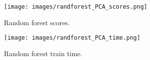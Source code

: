 \begin{figure}[h!]
    \centering
    \texttt{[image: images/randforest\_PCA\_scores.png]}
    \caption{Random forest scores.}
    \label{fig:randfor_scores}
\end{figure} 
 
 \begin{figure}[h!]
    \centering
    \texttt{[image: images/randforest\_PCA\_time.png]}
    \caption{Random forest train time.}
    \label{fig:randfor_times}
\end{figure} 
  
  
